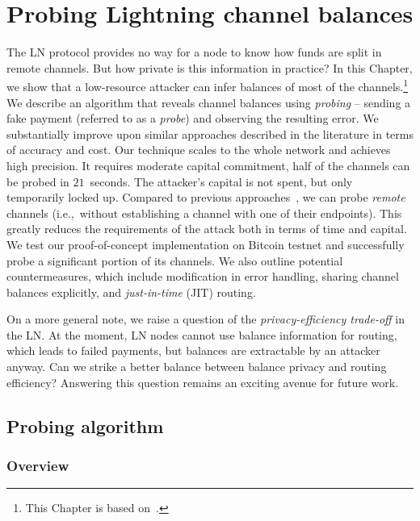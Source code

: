 \chapter{Probing Lightning channel balances}

\label{Chapter06LNprobing}

The LN protocol provides no way for a node to know how funds are split in remote channels.
But how private is this information in practice?
In this Chapter, we show that a low-resource attacker can infer balances of most of the channels.\footnote{This Chapter is based on~\cite{Tikhomirov2020}.}
We describe an algorithm that reveals channel balances using \textit{probing} -- sending a fake payment (referred to as a \textit{probe}) and observing the resulting error.
We substantially improve upon similar approaches described in the literature in terms of accuracy and cost.
Our technique scales to the whole network and achieves high precision.
It requires moderate capital commitment, half of the channels can be probed in $21$~seconds.
The attacker's capital is not spent, but only temporarily locked up.
Compared to previous approaches~\cite{HerreraJoancomarti2019, Dam2019}, we can probe \textit{remote} channels (i.e.,~without establishing a channel with one of their endpoints).
This greatly reduces the requirements of the attack both in terms of time and capital.
We test our proof-of-concept implementation on Bitcoin testnet and successfully probe a significant portion of its channels.
We also outline potential countermeasures, which include modification in error handling, sharing channel balances explicitly, and \textit{just-in-time} (JIT) routing.

On a more general note, we raise a question of the \textit{privacy-efficiency trade-off} in the LN\@.
At the moment, LN nodes cannot use balance information for routing, which leads to failed payments, but balances are extractable by an attacker anyway.
Can we strike a better balance between balance privacy and routing efficiency?
Answering this question remains an exciting avenue for future work.


\section{Probing algorithm}
\label{sec:probing}

\subsection{Overview}


